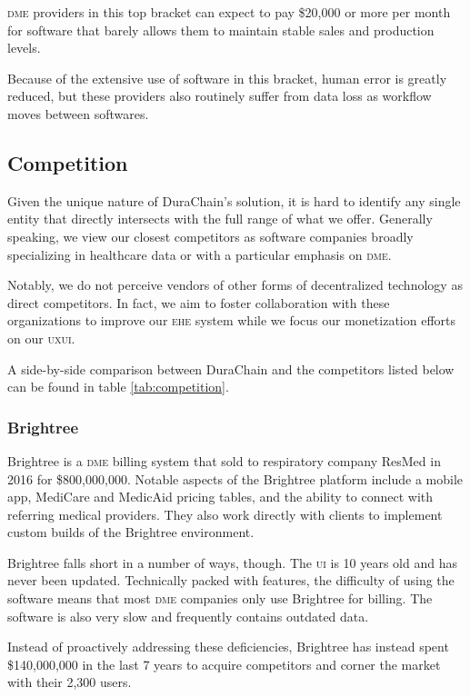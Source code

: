   \textsc{dme} providers in this top bracket can expect to pay \$20,000 or more per month for software that barely allows them to maintain stable sales and production levels.%

  Because of the extensive use of software in this bracket, human error is greatly reduced, but these providers also routinely suffer from data loss as workflow moves between softwares.%

\subsection{Competition}
Given the unique nature of DuraChain's solution, it is hard to identify any single entity that directly intersects with the full range of what we offer. Generally speaking, we view our closest competitors as software companies broadly specializing in healthcare data or with a particular emphasis on \textsc{dme}.%

Notably, we do not perceive vendors of other forms of decentralized technology as direct competitors. In fact, we aim to foster collaboration with these organizations to improve our \textsc{ehe} system while we focus our monetization efforts on our \textsc{uxui}.%

A side-by-side comparison between DuraChain and the competitors listed below can be found in table \ref{tab:competition}.

  \subsubsection{Brightree}
  Brightree is a \textsc{dme} billing system that sold to respiratory company ResMed in 2016 for \$800,000,000. Notable aspects of the Brightree platform include a mobile app, MediCare and MedicAid pricing tables, and the ability to connect with referring medical providers. They also work directly with clients to implement custom builds of the Brightree environment.%

  Brightree falls short in a number of ways, though. The \textsc{ui} is 10 years old and has never been updated. Technically packed with features, the difficulty of using the software means that most \textsc{dme} companies only use Brightree for billing. The software is also very slow and frequently contains outdated data.%

  Instead of proactively addressing these deficiencies, Brightree has instead spent \$140,000,000 in the last 7 years to acquire competitors and corner the market with their 2,300 users.%


